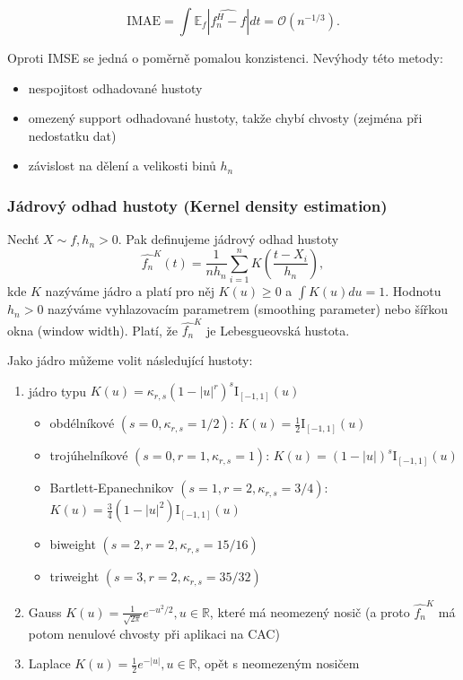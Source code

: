 \documentclass{article}
\theoremstyle{remark}
\theoremstyle{plain}
\theoremstyle{definition}
\theoremstyle{remark}
\begin{document}
$$
\text{IMAE} = \int \mathbb{E}_f |\hat{f_n^H - f}| dt = \mathcal{O}(n^{-1/3}).
$$

Oproti IMSE se jedná o poměrně pomalou konzistenci. Nevýhody této metody:

\begin{itemize}
    \item nespojitost odhadované hustoty
    \item omezený support odhadované hustoty, takže chybí chvosty (zejména při nedostatku dat)
    \item závislost na dělení a velikosti binů $h_n$
\end{itemize}

\subsubsection{Jádrový odhad hustoty (Kernel density estimation)}

Nechť $X \sim f, h_n > 0$. Pak definujeme jádrový odhad hustoty
$$
\hat{f_n}^K(t) = \frac{1}{nh_n} \sum_{i=1}^n K\left(\frac{t-X_i}{h_n}\right),
$$
kde $K$ nazýváme jádro a platí pro něj $K(u) \geq 0$ a $\int K(u) du = 1$. Hodnotu $h_n > 0$ nazýváme vyhlazovacím parametrem (smoothing parameter) nebo šířkou okna (window width). Platí, že $\hat{f_n}^K$ je Lebesgueovská hustota. \newline

Jako jádro můžeme volit následující hustoty:

\begin{enumerate}
    \item jádro typu $K(u) = \kappa_{r,s} (1-|u|^r)^s \text{I}_{[-1,1]}(u)$
    \begin{itemize}
        \item obdélníkové $(s=0,\kappa_{r,s}=1/2)$: $K(u) = \frac{1}{2} \text{I}_{[-1,1]}(u)$
        \item trojúhelníkové $(s=0,r=1,\kappa_{r,s}=1)$: $K(u) = \left(1-|u|\right)^s\text{I}_{[-1,1]}(u)$
        \item Bartlett-Epanechnikov $(s=1,r=2,\kappa_{r,s}=3/4)$: $K(u) = \frac{3}{4} \left(1-|u|^2\right)\text{I}_{[-1,1]}(u)$
        \item biweight $(s=2,r=2,\kappa_{r,s}=15/16)$
        \item triweight $(s=3,r=2,\kappa_{r,s}=35/32)$
    \end{itemize}
    \item Gauss $K(u) = \frac{1}{\sqrt{2\pi}} e^{-u^2/2}, u \in \mathbb{R}$, které má neomezený nosič (a proto $\hat{f_n}^K$ má potom nenulové chvosty při aplikaci na CAC)
    \item Laplace $K(u) = \frac{1}{2} e^{-|u|}, u \in \mathbb{R}$, opět s neomezeným nosičem
\end{enumerate}
\end{document}
